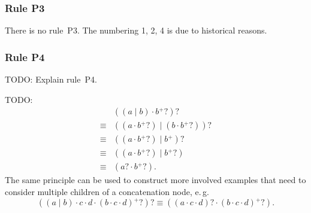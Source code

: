 \documentclass[a4paper,11pt, svgnames,titlepage]{article}
\newcommand{\rxp}{{^\mathtt{+}}}
\newcommand{\rxo}{\mathtt{?}}
\newcommand{\rxc}{\cdot}
\DeclareMathOperator{\ror}{\mathtt{|}}
\begin{document}
\subsubsection{Rule P3}
There is no rule~P3. The numbering 1, 2, 4 is due to historical reasons.
\subsubsection{Rule P4}


TODO: Explain rule~P4.

TODO:
\begin{align*}
		& ((a \ror b) \rxc b\rxp\rxo)\rxo\\
\equiv	& ((a \rxc b\rxp\rxo) \ror (b \rxc b\rxp\rxo))\rxo\\
\equiv	& ((a \rxc b\rxp\rxo) \ror b\rxp)\rxo\\
\equiv	& ((a \rxc b\rxp\rxo) \ror b\rxp\rxo)\\
\equiv	& (a\rxo \rxc b\rxp\rxo). 
\end{align*}
The same principle can be used to construct more involved examples that need to consider multiple children of a concatenation node, e.\,g.
\begin{equation*}
	((a \ror b) \rxc c \rxc d \rxc (b \rxc c \rxc d)\rxp\rxo)\rxo \equiv 
	((a \rxc c \rxc d)\rxo \rxc (b \rxc c \rxc d)\rxp\rxo).
\end{equation*}
\end{document}
